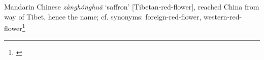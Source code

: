 \begin{etymology}\label{ety:zanghonghua}
Mandarin Chinese  \textit{zànghónghuā} `saffron' [Tibetan-red-flower], reached China from way of Tibet, hence the name; cf. synonyms: foreign-red-flower, western-red-flower\footnote{\textcite{kleeman_oxford_2010}}
\end{etymology}
